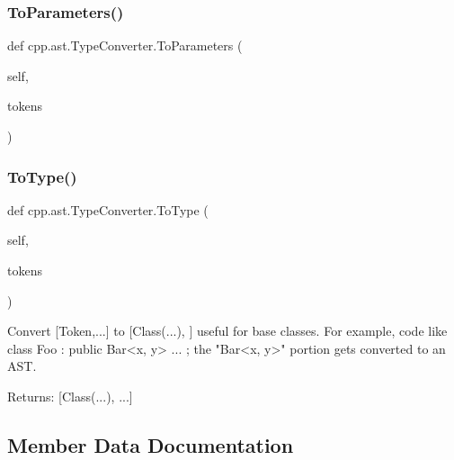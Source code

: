 \mbox{\label{classcpp_1_1ast_1_1_type_converter_aeaf27fb1890f65d7216703df610b46d5}} 
\subsubsection{\texorpdfstring{ToParameters()}{ToParameters()}}
{\footnotesize\ttfamily def cpp.\+ast.\+Type\+Converter.\+To\+Parameters (\begin{DoxyParamCaption}\item[{}]{self,  }\item[{}]{tokens }\end{DoxyParamCaption})}

\mbox{\label{classcpp_1_1ast_1_1_type_converter_aa6ea82e40cd30e5dfcd471ff144a19cf}} 
\subsubsection{\texorpdfstring{ToType()}{ToType()}}
{\footnotesize\ttfamily def cpp.\+ast.\+Type\+Converter.\+To\+Type (\begin{DoxyParamCaption}\item[{}]{self,  }\item[{}]{tokens }\end{DoxyParamCaption})}

\begin{DoxyVerb}Convert [Token,...] to [Class(...), ] useful for base classes.
For example, code like class Foo : public Bar<x, y> { ... };
the "Bar<x, y>" portion gets converted to an AST.

Returns:
  [Class(...), ...]
\end{DoxyVerb}
 

\subsection{Member Data Documentation}
\mbox{\label{classcpp_1_1ast_1_1_type_converter_abb739f15c6cd0800e07c086c2b30833e}} 
